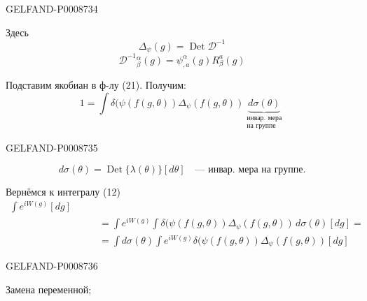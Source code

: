 \begin{GelfandAdjacentEvidence}{GELFAND-P000873}{4}


Здесь
\begin{equation*}
\Delta_\psi(g)=\operatorname{Det}\mathcal D^{-1}
\tag{24}
\end{equation*}
\begin{equation*}
\mathcal D^{-1}{}^\alpha_\beta(g)=\psi^\alpha_{,a}(g)R_\beta^a(g)
\tag{25}
\end{equation*}

Подставим якобиан в ф-лу (21). Получим:
\begin{equation*}
1=\int\delta(\psi(f(g,\theta))\Delta_\psi(f(g,\theta))
\underbrace{d\sigma(\theta)}_{\substack{\text{инвар. мера}\\\text{на группе}}}
\tag{26}
\end{equation*}
\end{GelfandAdjacentEvidence}
\begin{GelfandAdjacentEvidence}{GELFAND-P000873}{5}


\begin{equation*}
d\sigma(\theta)=\operatorname{Det}\{\lambda(\theta)\}[d\theta]
\quad\text{--- инвар. мера на группе.}
\tag{27}
\end{equation*}

Вернёмся к интегралу (12)
\begin{equation*}
\begin{aligned}
\int e^{iW(g)}[dg]\qquad &\\[-.2ex]
&=\int e^{iW(g)}\int\delta(\psi(f(g,\theta))
\Delta_\psi(f(g,\theta))\,d\sigma(\theta)[dg]=\\
&=\int d\sigma(\theta)\int e^{iW(g)}\delta(\psi(f(g,\theta))
\Delta_\psi(f(g,\theta))[dg]
\end{aligned}
\tag{28}
\end{equation*}
\end{GelfandAdjacentEvidence}
\begin{GelfandAdjacentEvidence}{GELFAND-P000873}{6}

\end{GelfandAdjacentEvidence}


Замена переменной;


